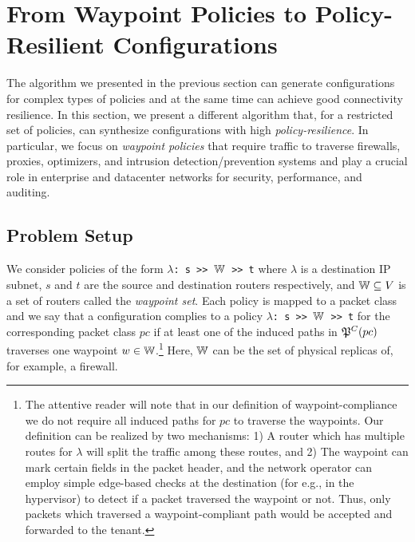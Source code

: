 \section{From Waypoint Policies to Policy-Resilient Configurations}
\label{sec:waypointres}


The algorithm we presented in the previous section can generate configurations
for complex types of policies and at the same time can achieve good
connectivity resilience.
In this section, we present a different algorithm that, for a restricted set of policies,
can synthesize configurations with high \emph{policy-resilience}.
In particular, we focus on \emph{waypoint policies}
that require traffic to traverse
firewalls,
proxies, optimizers, and intrusion detection/prevention 
systems and
play a crucial role in enterprise and
datacenter networks for security, performance,  
and auditing.

\subsection{Problem Setup}

We consider policies of the form 
\texttt{$\lambda$: s >> $\mathbb{W}$ >> t}
where $\lambda$ is a destination IP subnet,  
$s$ and $t$ are the source and destination routers respectively, 
and $\mathbb{W} \subseteq V$ is a set of routers called the \emph{waypoint set}. 
Each policy is mapped to a packet class and
we say that a configuration complies to a policy 
\texttt{$\lambda$: s >> $\mathbb{W}$ >> t}
 for the corresponding packet class
$pc$ if
at least one of the induced paths in $\mathfrak{P}^C(pc)$ 
traverses one waypoint $w \in \mathbb{W}$.\footnote{
The attentive reader will note that in our definition of waypoint-compliance 
we do not require all induced paths for $pc$ to traverse the waypoints. 
Our 
definition can be realized by two mechanisms: 1) A router
which has multiple routes for $\lambda$ will split the traffic
among these routes, and 2) The waypoint can mark certain fields in
the packet header, and the network operator can employ 
simple edge-based checks at the destination 
(for e.g., in the hypervisor) to 
detect if a packet traversed the waypoint or not. Thus, only
packets which traversed a waypoint-compliant path would be 
accepted and forwarded to the tenant. 
}
Here, $\mathbb{W}$
can be the set of physical replicas of,  for example, a firewall.


